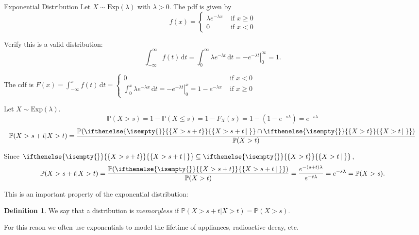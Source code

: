 \documentclass[a4paper,11pt]{amsbook}
\makeatletter
\def\section{\@startsection{section}{2}%
    \z@{1\linespacing\@plus1\linespacing}{.5\linespacing}%
    {\large\normalfont\bfseries\centering\color{darkblue}}}
\theoremstyle{definition}
\newtheorem{definition}{\hspace{-2em} \color{darkblue} Definition}[chapter]
\theoremstyle{remark}
\renewcommand{\P}{\mathbb{P}}
\newcommand\inc\subseteq
\newcommand\0{\varnothing}
\newcommand\dt[1][t]{\,\mathrm{d}#1}
\newcommand\Exp{\text{Exp}}
\newcommand\set[2][]
{
    \ifthenelse{\isempty{#1}}
    {
        \left\{#2\right\}
    }
    {
        \left\{#2\left|\,#1\right.\right\}
    }
}
\makeatother
\begin{document}
    \section{Exponential Distribution}
    Let $X\sim\Exp(\lambda)$ with $\lambda>0$. The pdf is given by $$f(x)=\begin{cases}
        \lambda e^{-\lambda x} & \text{ if }x\geq0 \\
        0 & \text{ if }x<0
    \end{cases}$$

    Verify this is a valid distribution: 
    $$\int_{-\infty}^{\infty}f(t)\dt=\int_0^\infty\lambda e^{-\lambda t}\dt=\left.-e^{-\lambda t}\right|_0^\infty=1.$$
    
    The cdf is $F(x)=\int_{-\infty}^xf(t)\dt=\begin{cases}
        0 & \text{ if }x<0 \\
        \int_0^x\lambda e^{-\lambda x}\dt=\left.-e^{-\lambda t}\right|_0^x=1-e^{-\lambda x} & \text{ if }x\geq 0
    \end{cases}$
    \begin{center}
    \end{center}

    Let $X\sim\Exp(\lambda)$.
    $$\P(X>s)=1-\P(X\leq s)=1-F_X(s)=1-(1-e^{-s\lambda})=e^{-s\lambda}$$
    $$\P(X>s+t|X>t)=\frac{\P(\set{X>s+t}\cap\set{X>t})}{\P(X>t)}$$

    Since $\set{X>s+t}\inc\set{X>t}$,
    $$\P(X>s+t|X>t)=\frac{\P(\set{X>s+t})}{\P(X>t)}=\frac{e^{-(s+t)\lambda}}{e^{-t\lambda}}=e^{-s\lambda}=\P(X>s).$$
    
    This is an important property of the exponential distribution:
    \begin{definition}
        We say that a distribution is $memoryless$ if $\P(X>s+t|X>t)=\P(X>s)$.
    \end{definition}
    For this reaon we often use exponentials to model the lifetime of appliances, radioactive decay, etc.\\
    
\end{document}
